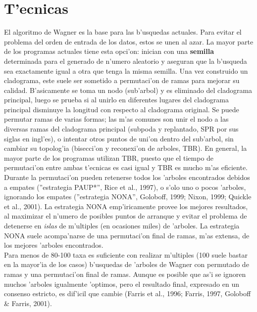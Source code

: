\section{T'ecnicas}
El algoritmo de Wagner es la base para las b'usquedas actuales. Para evitar el problema del orden de entrada de los datos, estos se unen al azar. La mayor parte de los programas actuales tiene esta opci'on: inician con una \textbf{semilla} determinada para el generado de n'umero aleatorio y aseguran que la b'usqueda sea exactamente igual a otra que tenga la misma semilla. Una vez construido un cladograma, este suele ser sometido a permutaci'on de ramas para mejorar su calidad. B'asicamente se toma un nodo (sub'arbol) y es eliminado del cladograma principal, luego se prueba si al unirlo en diferentes lugares del cladograma principal disminuye la longitud con respecto al cladograma original. Se puede permutar ramas de varias formas; las m'as comunes son unir el nodo a las diversas ramas del cladograma principal (subpoda y replantado, SPR por sus siglas en ingl'es), o intentar otros puntos de uni'on dentro del sub'arbol, sin cambiar su topolog'ia (bisecci'on y reconexi'on de arboles, TBR). En general, la mayor parte de los programas utilizan TBR, puesto que el tiempo de permutaci'on entre ambas t'ecnicas es casi igual y TBR es mucho m'as eficiente.\\
Durante la permutaci'on pueden retenerse todos los 'arboles encontrados debidos a empates (''estrategia PAUP*'', Rice et al., 1997), o s'olo uno o pocos 'arboles, ignorando los empates (''estrategia NONA'', Goloboff, 1999; Nixon, 1999; Quickle et al., 2001). La estrategia NONA emp'iricamente provee los mejores resultados, al maximizar el n'umero de posibles puntos de arranque y evitar el problema de detenerse en \emph{islas} de m'ultiples (en ocasiones miles) de 'arboles. La estrategia NONA suele acompa'narse de una permutaci'on final de ramas, m'as extensa, de los mejores 'arboles encontrados.\\
Para menos de 80-100 taxa es suficiente con  realizar m'ultiples (100 suele bastar en la mayor'ia de los casos) b'usquedas de 'arboles de Wagner con permutado de ramas y una permutaci'on final de ramas. Aunque es posible que as'i se ignoren muchos 'arboles igualmente 'optimos, pero el resultado final, expresado en un consenso estricto, es dif'icil que cambie (Farris et al., 1996; Farris, 1997, Goloboff \& Farris, 2001).\\
